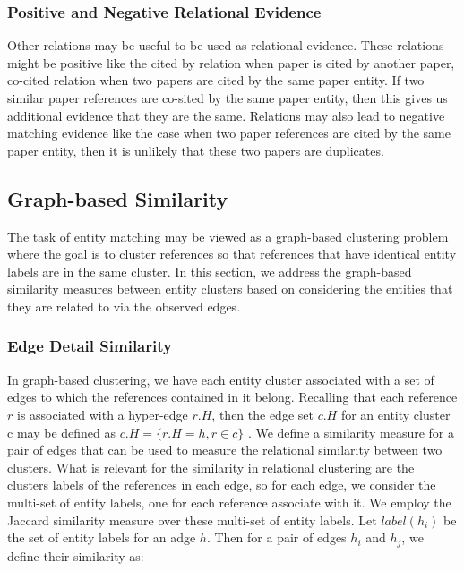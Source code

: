 \subsubsection{Positive and Negative Relational Evidence}
Other relations may be useful to be used as relational evidence. These relations might be positive like the cited by relation when paper is cited by another paper, co-cited relation when two papers are cited by the same paper entity. If two similar paper references are co-sited by the same paper entity, then this gives us additional evidence that they are the same. Relations may also lead to negative matching evidence like the case when two paper references are cited by the same paper entity, then it is unlikely that these two papers are duplicates.

\subsection{Graph-based Similarity}
The task of entity matching may be viewed as a graph-based clustering problem where the goal is to cluster references so that references that have identical entity labels are in the same cluster. In this section, we address the graph-based similarity measures between entity clusters based on considering the entities that they are related to via the observed edges\cite{BhGe06b}. 

\subsubsection{Edge Detail Similarity}
In graph-based clustering, we have each entity cluster associated with a set of edges to which the references contained in it belong. Recalling that each reference $r$ is associated with a hyper-edge $r.H$, then the edge set $c.H$ for an entity cluster c may be defined as $c.H=\{r.H=h, r\in c\}$     . We define a similarity measure for a pair of edges that can be used to measure the relational similarity between two clusters. What is relevant for the similarity in  relational clustering are the clusters labels of the references in each edge, so for each edge, we consider the multi-set of entity labels, one for each reference associate with it. We employ the Jaccard similarity measure over these multi-set of entity labels. Let $label(h_i)$ be the set of entity labels for an adge $h$. Then for a pair of edges $h_i$ and $h_j$, we define their similarity as:  

